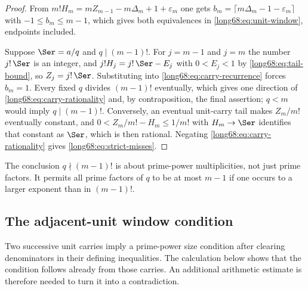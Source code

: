 \begin{proof}
From $m!H_m=mZ_{m-1}-m\Delta_m+1+\varepsilon_m$ one gets
$b_m=\lceil m\Delta_m-1-\varepsilon_m\rceil$ with $-1\le b_m\le m-1$, which
gives both equivalences in \eqref{long68:eq:unit-window}, endpoints included.

Suppose $\Ser=a/q$ and $q\mid(m-1)!$.  For $j=m-1$ and $j=m$ the number
$j!\,\Ser$ is an integer, and $j!H_j=j!\,\Ser-E_j$ with $0<E_j<1$ by
\eqref{long68:eq:tail-bound}, so $Z_j=j!\,\Ser$.  Substituting into
\eqref{long68:eq:carry-recurrence} forces $b_m=1$.  Every fixed $q$ divides
$(m-1)!$ eventually, which gives one direction of
\eqref{long68:eq:carry-rationality} and, by contraposition, the final assertion;
$q<m$ would imply $q\mid(m-1)!$.  Conversely, an eventual unit-carry tail
makes $Z_m/m!$ eventually constant, and $0<Z_m/m!-H_m\le1/m!$ with
$H_m\to\Ser$ identifies that constant as $\Ser$, which is then rational.
Negating \eqref{long68:eq:carry-rationality} gives \eqref{long68:eq:strict-misses}.
\end{proof}

The conclusion $q\nmid(m-1)!$ is about prime-power multiplicities, not
just prime factors. It permits all prime factors of $q$ to be at most
$m-1$ if one occurs to a larger exponent than in $(m-1)!$.

\subsection{The adjacent-unit window condition}
\label{long68:sec:adjacent-unit-no-go}

Two successive unit carries imply a prime-power size condition after
clearing denominators in their defining inequalities. The calculation
below shows that the condition follows already from those carries.
An additional arithmetic estimate is therefore needed to turn it into
a contradiction.

